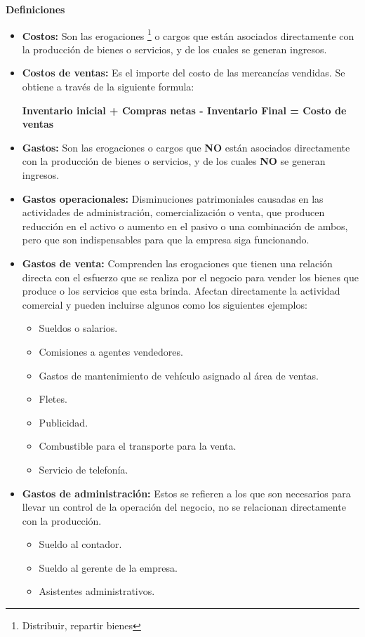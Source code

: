 \documentclass[letter,12pt]{article}
\begin{document}
			\textbf{Definiciones}
			\begin{itemize}
				\item \textbf{Costos:} Son las erogaciones \footnote{Distribuir, repartir bienes} o cargos que están asociados directamente con la producción de bienes o servicios, y de los cuales se generan ingresos.
				
				\item \textbf{Costos de ventas:} Es el importe del costo de las mercancías vendidas. Se obtiene a través de la siguiente formula:
				\begin{center}
					\textbf{Inventario inicial + Compras netas - Inventario Final = Costo de ventas}
				\end{center}
			    
			    \item \textbf{Gastos:} Son las erogaciones  o cargos que \textbf{NO} están asociados directamente con la producción de bienes o servicios, y de los cuales \textbf{NO} se generan ingresos.
			    
			    \item \textbf{Gastos operacionales:} Disminuciones patrimoniales causadas en las actividades de administración, comercialización o venta, que producen reducción en el activo o aumento en el pasivo o una combinación de ambos, pero que son indispensables para que la empresa siga funcionando.
			    
			    \item \textbf{Gastos de venta:} Comprenden las erogaciones que tienen una relación directa con el esfuerzo que se realiza por el negocio para vender los bienes que produce o los servicios que esta brinda. Afectan directamente la actividad comercial y pueden incluirse algunos como los siguientes ejemplos:
			    	\begin{itemize}
			    		\item Sueldos o salarios.
			    		\item Comisiones a agentes vendedores.
			    		\item Gastos de mantenimiento de vehículo asignado al área de ventas.
			    		\item Fletes.
			    		\item Publicidad.
			    		\item Combustible para el transporte para la venta.
			    		\item Servicio de telefonía.
			    	\end{itemize}
			    
			    \item \textbf{Gastos de administración:} Estos se refieren a los que son necesarios para llevar un control de la operación del negocio, no se relacionan directamente con la producción.
			    \begin{itemize}
			    	\item Sueldo al contador.
			    	\item Sueldo al gerente de la empresa.
			    	\item Asistentes administrativos.
			    \end{itemize}
			    

\end{itemize}
\end{document}
